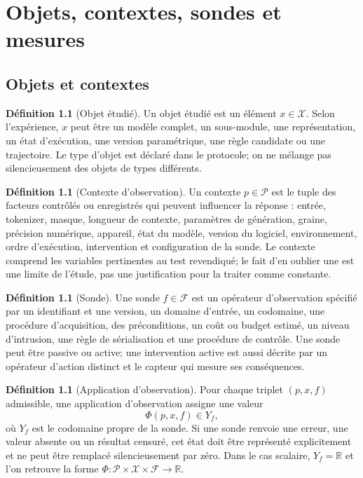 \documentclass[11pt,oneside]{book}
\theoremstyle{definition}
\newtheorem{definition}[theoreme]{Définition}
\theoremstyle{remark}
\newcommand{\X}{\mathcal X}
\newcommand{\Pcal}{\mathcal P}
\newcommand{\Fcal}{\mathcal F}
\newcommand{\R}{\mathbb R}
\newcommand{\1}{\mathbf 1}
\begin{document}
\chapter{Objets, contextes, sondes et mesures}
\section{Objets et contextes}
\begin{definition}[Objet étudié]
Un objet étudié est un élément $x\in\X$. Selon l'expérience, $x$ peut être un modèle complet, un sous-module, une représentation, un état d'exécution, une version paramétrique, une règle candidate ou une trajectoire. Le type d'objet est déclaré dans le protocole; on ne mélange pas silencieusement des objets de types différents.
\end{definition}

\begin{definition}[Contexte d'observation]
Un contexte $p\in\Pcal$ est le tuple des facteurs contrôlés ou enregistrés qui peuvent influencer la réponse : entrée, tokenizer, masque, longueur de contexte, paramètres de génération, graine, précision numérique, appareil, état du modèle, version du logiciel, environnement, ordre d'exécution, intervention et configuration de la sonde. Le contexte comprend les variables pertinentes au test revendiqué; le fait d'en oublier une est une limite de l'étude, pas une justification pour la traiter comme constante.
\end{definition}

\begin{definition}[Sonde]
Une sonde $f\in\Fcal$ est un opérateur d'observation spécifié par un identifiant et une version, un domaine d'entrée, un codomaine, une procédure d'acquisition, des préconditions, un coût ou budget estimé, un niveau d'intrusion, une règle de sérialisation et une procédure de contrôle. Une sonde peut être passive ou active; une intervention active est aussi décrite par un opérateur d'action distinct et le capteur qui mesure ses conséquences.
\end{definition}

\begin{definition}[Application d'observation]
Pour chaque triplet $(p,x,f)$ admissible, une application d'observation assigne une valeur
\[
\Phi(p,x,f)\in Y_f,
\]
où $Y_f$ est le codomaine propre de la sonde. Si une sonde renvoie une erreur, une valeur absente ou un résultat censuré, cet état doit être représenté explicitement et ne peut être remplacé silencieusement par zéro. Dans le cas scalaire, $Y_f=\R$ et l'on retrouve la forme $\Phi:\Pcal\times\X\times\Fcal\to\R$.
\end{definition}
\end{document}
